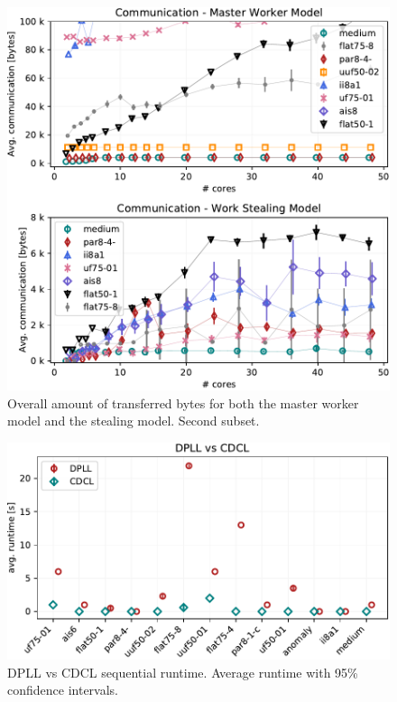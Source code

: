 \documentclass[letterpaper]{article}
\begin{document}
\begin{figure}[p]
    \centering
    \includegraphics[width=\columnwidth]{figures/comm_non_subset_dpll_scaling_tar.pdf}
    \caption{Overall amount of transferred bytes for both the master worker model and the stealing model.
    Second subset.}
    \label{fig:comm_reduce_non}
\end{figure}

\begin{figure}[h]
    \centering
    \includegraphics[width=\columnwidth]{figures/dpll_vs_cdcl.pdf}
    \caption{DPLL vs CDCL sequential runtime. Average runtime with 95\% confidence intervals.}
    \label{fig:dpll_vs_cdcl}
\end{figure}
\end{document}
